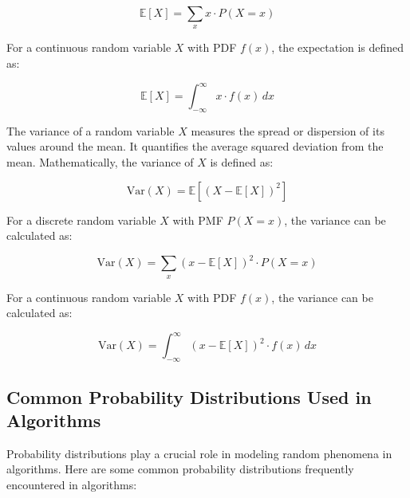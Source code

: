 \documentclass[12pt]{book} %
\begin{document}
\[
\mathbb{E}[X] = \sum_{x} x \cdot P(X=x)
\]

For a continuous random variable \(X\) with PDF \(f(x)\), the expectation is defined as:

\[
\mathbb{E}[X] = \int_{-\infty}^{\infty} x \cdot f(x) \, dx
\]

The variance of a random variable \(X\) measures the spread or dispersion of its values around the mean. It quantifies the average squared deviation from the mean. Mathematically, the variance of \(X\) is defined as:

\[
\text{Var}(X) = \mathbb{E}[(X - \mathbb{E}[X])^2]
\]

For a discrete random variable \(X\) with PMF \(P(X=x)\), the variance can be calculated as:

\[
\text{Var}(X) = \sum_{x} (x - \mathbb{E}[X])^2 \cdot P(X=x)
\]

For a continuous random variable \(X\) with PDF \(f(x)\), the variance can be calculated as:

\[
\text{Var}(X) = \int_{-\infty}^{\infty} (x - \mathbb{E}[X])^2 \cdot f(x) \, dx
\]

\subsection{Common Probability Distributions Used in Algorithms}

Probability distributions play a crucial role in modeling random phenomena in algorithms. Here are some common probability distributions frequently encountered in algorithms:
\end{document}
